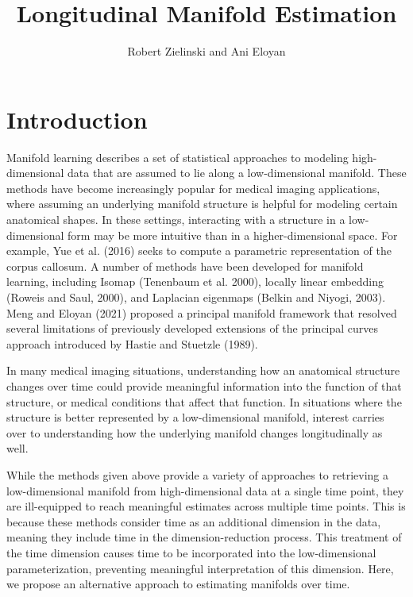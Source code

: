 \documentclass[11pt,reqno]{article}
\begin{document}
\title{Longitudinal Manifold Estimation}
\author[1]{Robert Zielinski and Ani Eloyan}


\maketitle

\section{Introduction}

Manifold learning describes a set of statistical approaches to modeling high-dimensional data that are assumed to lie along a low-dimensional manifold. These methods have become increasingly popular for medical imaging applications, where assuming an underlying manifold structure is helpful for modeling certain anatomical shapes. In these settings, interacting with a structure in a low-dimensional form may be more intuitive than in a higher-dimensional space. For example, Yue et al. (2016) seeks to compute a parametric representation of the corpus callosum. A number of methods have been developed for manifold learning, including Isomap (Tenenbaum et al. 2000), locally linear embedding (Roweis and Saul, 2000), and Laplacian eigenmaps (Belkin and Niyogi, 2003). Meng and Eloyan (2021) proposed a principal manifold framework that resolved several limitations of previously developed extensions of the principal curves approach introduced by Hastie and Stuetzle (1989).

In many medical imaging situations, understanding how an anatomical structure changes over time could provide meaningful information into the function of that structure, or medical conditions that affect that function. In situations where the structure is better represented by a low-dimensional manifold, interest carries over to understanding how the underlying manifold changes longitudinally as well. 

While the methods given above provide a variety of approaches to retrieving a low-dimensional manifold from high-dimensional data at a single time point, they are ill-equipped to reach meaningful estimates across multiple time points. This is because these methods consider time as an additional dimension in the data, meaning they include time in the dimension-reduction process. This treatment of the time dimension causes time to be incorporated into the low-dimensional parameterization, preventing meaningful interpretation of this dimension. Here, we propose an alternative approach to estimating manifolds over time.
\end{document}
